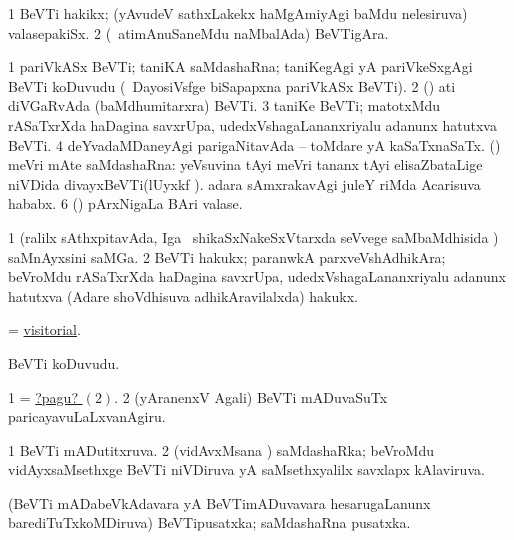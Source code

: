 \bentry 
{} 
\gl{\nA}
\expl{}
\bmng
\bnum
\num{1} BeVTi hakikx; (yAvudeV sathxLakekx haMgAmiyAgi baMdu nelesiruva) valasepakiSx. 
\num{2} (\kanmu\ atimAnuSaneMdu naMbalAda) BeVTigAra. 
\enum
\emng
\eentry

\bentry
{} 
\gl{\nA}
\expl{}
\bmng
\bnum
\num{1} pariVkASx BeVTi; taniKA saMdashaRna; taniKegAgi yA pariVkeSxgAgi BeVTi koDuvudu (\kanmu\ DayosiVsfge biSapapxna pariVkASx BeVTi). 
\num{2} (\AmA) ati diVGaRvAda (baMdhumitarxra) BeVTi. 
\num{3} taniKe BeVTi; matotxMdu rASaTxrXda haDagina savxrUpa, udedxVshagaLananxriyalu adanunx hatutxva BeVTi. 
\num{4} deYvadaMDaneyAgi parigaNitavAda -- toMdare yA kaSaTxnaSaTx. 
 () meVri mAte saMdashaRna: 
\banum
{} yeVsuvina tAyi meVri tananx tAyi elisaZbataLige niVDida divayxBeVTi(lUyxkf ). 
 adara sAmxrakavAgi juleY riMda Acarisuva hababx. 
\eanum
\numie
\num{6} (\pArxvi) pArxNigaLa BAri valase. 
\enum
\emng

\noindent 
\gl{\pagu}
\expl{}
\bmng
\bnum
\num{1}  (ralilx sAthxpitavAda, Iga \kanmu\ shikaSxNakeSxVtarxda seVvege saMbaMdhisida \roVkAyx) saMnAyxsini saMGa. 
\hypertarget{visitation pagu(2)}{} 
\num{2}  BeVTi hakukx; paranwkA parxveVshAdhikAra; beVroMdu rASaTxrXda haDagina savxrUpa, udedxVshagaLananxriyalu adanunx hatutxva (Adare shoVdhisuva adhikAravilalxda) hakukx. 
\enum
\emng
\eentry

\bentry 
{} 
\gl{\gu}
\expl{}
\bmng
 = \hyperlink{visitorial}{visitorial}. 
\emng
\eentry

\bentry
{} 
\gl{\nA}
\expl{}
\bmng
BeVTi koDuvudu. 
\emng

\noindent
\gl{\pagu}
\bmng
\bnum
\num{1}  = \hyperlink{visiting pagu2}{?pagu? \((2)\)}. 
\hypertarget{visiting pagu2}{} 
\num{2} (yAranenxV Agali) BeVTi mADuvaSuTx paricayavuLaLxvanAgiru. 
\enum
\emng
\eentry

\bentry
{} 
\gl{\gu}
\expl{}
\bmng
\bnum
\num{1} BeVTi mADutitxruva. 
\num{2} (vidAvxMsana \vi) saMdashaRka; beVroMdu vidAyxsaMsethxge BeVTi niVDiruva yA saMsethxyalilx savxlapx kAlaviruva. 
\enum
\emng
\eentry

\bentry
{} 
\gl{\nA}
\expl{}
\bmng
 (BeVTi mADabeVkAdavara yA BeVTimADuvavara hesarugaLanunx barediTuTxkoMDiruva) BeVTipusatxka; saMdashaRna pusatxka. 
\emng
\eentry

